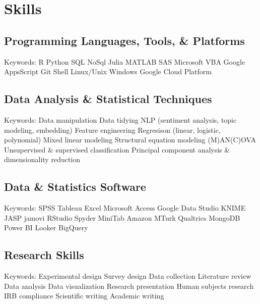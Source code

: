 \documentclass[letterpaper]{deedy-resume_sm}
\begin{document}
\section{Skills}
\subsection{Programming Languages, Tools, \& Platforms}
Keywords: R \textbullet{} Python \textbullet{} SQL \textbullet{} NoSql \textbullet{} Julia \textbullet{} MATLAB \textbullet{} SAS \textbullet{} Microsoft VBA \textbullet{} Google AppsScript \textbullet{} Git \textbullet{} Shell \textbullet{} Linux/Unix \textbullet{} Windows \textbullet{} Google Cloud Platform

\subsection{Data Analysis \& Statistical Techniques}
Keywords: Data manipulation \textbullet{} Data tidying \textbullet{} NLP (sentiment analysis, topic modeling, embedding) \textbullet{} Feature engineering \textbullet{} Regresison (linear, logistic, polynomial) \textbullet{} Mixed linear modeling \textbullet{} Structural equation modeling \textbullet{} (M)AN(C)OVA \textbullet{} Unsupervised \& supervised classification \textbullet{} Principal component analysis \& dimensionality reduction

\subsection{Data \& Statistics Software}
Keywords: SPSS \textbullet{} Tableau \textbullet{} Excel \textbullet{} Microsoft Access \textbullet{} Google Data Studio \textbullet{} KNIME \textbullet{} JASP \textbullet{} jamovi \textbullet{} RStudio \textbullet{} Spyder \textbullet{} MiniTab \textbullet{} Amazon MTurk \textbullet{} Qualtrics \textbullet{} MongoDB \textbullet{} Power BI \textbullet{} Looker \textbullet{} BigQuery

\subsection{Research Skills}
Keywords: Experimental design \textbullet{} Survey design \textbullet{} Data collection \textbullet{} Literature review \textbullet{} Data analysis \textbullet{} Data visualization \textbullet{} Research presentation \textbullet{} Human subjects research \textbullet{} IRB compliance \textbullet{} Scientific writing \textbullet{} Academic writing
\end{document}

